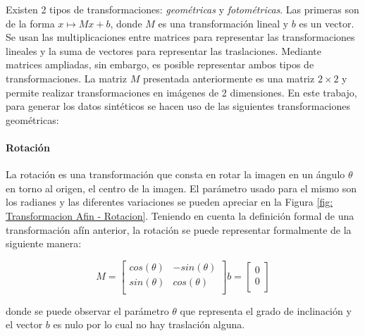 			Existen 2 tipos de transformaciones: \textit{geométricas} y \textit{fotométricas}. Las primeras son de la forma $x\mapsto Mx + b$, donde $M$ es una transformación lineal y $b$ es un vector. Se usan las multiplicaciones entre matrices para representar las transformaciones lineales y la suma de vectores para representar las traslaciones. Mediante matrices ampliadas, sin embargo, es posible representar ambos tipos de transformaciones.	La matriz $M$ presentada anteriormente es una matriz $2\times 2$ y permite realizar transformaciones en imágenes de 2 dimensiones. En este trabajo, para generar los datos sintéticos se hacen uso de las siguientes transformaciones geométricas:
			
			\paragraph{Rotación}
			
				La rotación es una transformación que consta en rotar la imagen en un ángulo $\theta$ en torno al origen, el centro de la imagen. El parámetro usado para el mismo son los radianes y las diferentes variaciones se pueden apreciar en la Figura \ref{fig: Transformacion Afin - Rotacion}. Teniendo en cuenta la definición formal de una transformación afín anterior, la rotación se puede representar formalmente de la siguiente manera:

			\begin{equation*}
					M =  
					\begin{bmatrix}
						cos(\theta) & -sin(\theta) \\
						sin(\theta) & cos(\theta)  \\
					\end{bmatrix}
					b =
					\begin{bmatrix}
						0 \\
						0 \\
					\end{bmatrix}	
			\end{equation*}

	donde se puede observar el parámetro $\theta$ que representa el grado de inclinación y el vector $b$ es nulo por lo cual no hay traslación alguna.

